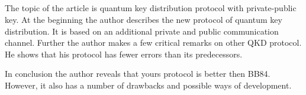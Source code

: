\subsection{\review}

The topic of the article is quantum key distribution protocol with private-public key. At the beginning the author describes the new protocol of quantum key distribution. It is based on an additional private and public communication channel. Further the author makes a few critical remarks on other QKD protocol. He shows that his protocol has fewer errors than its predecessors.

In conclusion the author reveals that yours protocol is better then BB84. However, it also has a number of drawbacks and possible ways of development.
 

\subsection{\dic}
